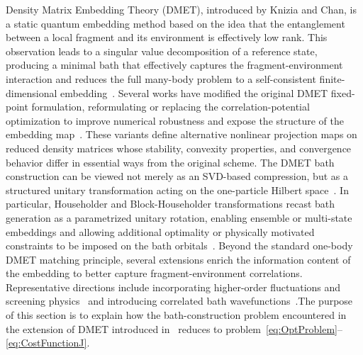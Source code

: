 \documentclass{article}
\newcommand{\1}{{\mathds 1}}
\begin{document}
Density Matrix Embedding Theory (DMET), introduced by Knizia and Chan, is a static quantum embedding method based on the idea that the entanglement between a local fragment and its environment is effectively low rank. This observation leads to a singular value decomposition of a reference state, producing a minimal bath that effectively captures the fragment-environment interaction and reduces the full many-body problem to a self-consistent finite-dimensional embedding~\cite{DMET2012,DMET2013,bulik2014density,kretchmer2018real,wouters2016practical}. 
Several works have modified the original DMET fixed-point formulation, reformulating or replacing the correlation-potential optimization to improve numerical robustness and expose the structure of the embedding map~\cite{wu2019projected,wu2020enhancing,lin2022variational,faulstich2022pure}. These variants define alternative nonlinear projection maps on reduced density matrices whose stability, convexity properties, and convergence behavior differ in essential ways from the original scheme. 
The DMET bath construction can be viewed not merely as an SVD-based compression, but as a structured unitary transformation acting on the one-particle Hilbert space~\cite{negre2025DMET}. In particular, Householder and Block-Householder transformations recast bath generation as a parametrized unitary rotation, enabling ensemble or multi-state embeddings and allowing additional optimality or physically motivated constraints to be imposed on the bath orbitals~\cite{Sekaran2021,yalouz2022quantum,Sekaran2022,Marecat2023,cernatic2024fragment}.
Beyond the standard one-body DMET matching principle, several extensions enrich the information content of the embedding to better capture fragment-environment correlations. Representative directions include incorporating higher-order fluctuations and screening physics~\cite{booth2015spectral,fertitta2018rigorous,Fertitta2019,sriluckshmy2021fully,scott2021extending,nusspickel2022systematic} and introducing correlated bath wavefunctions~\cite{tsuchimochi2015density}.The purpose of this section is to explain how the bath-construction problem encountered in the extension of DMET introduced in~\cite{negre2025DMET} reduces to problem~\eqref{eq:OptProblem}--\eqref{eq:CostFunctionJ}.\\
\end{document}
